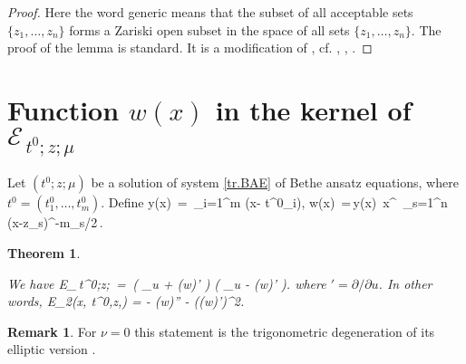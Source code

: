\documentclass[12pt]{amsart}
\newtheorem{thm}{Theorem}[section]
\numberwithin{equation}{section}
\theoremstyle{definition}
\newtheorem*{rem}{Remark}
\let\mc\mathcal
\let\der\partial
\begin{document}
\begin{proof}
Here the word generic means 
that the subset of all acceptable  sets $\{z_1,\dots,z_n\}$ forms a Zariski open subset in the space
of all sets $\{z_1,\dots,z_n\}$. The proof of the lemma is standard. It is a modification of \cite[Theorem 8]{ScV},
cf. \cite[Section 4.4]{MV1}, \cite[Section 5.4]{MV2}, \cite[Section 10.6]{MTV1}.
\end{proof}



\section{Function $w(x)$ in the kernel of  $\mc E_{\,t^0;z;\mu}$}
\label{sec 6}





Let $(t^0;z;\mu)$  be a solution of system \eqref{tr.BAE} of  Bethe ansatz equations, where
$t^0=(t^0_1,\dots,t^0_m)$. Define 
\bean
\label{Y&u}
y(x) \,=\, \prod_{i=1}^m (x- t^0_i), \qquad  
w(x) \,=\,y(x)\, x^{} \,\prod_{s=1}^n (x-z_s)^{-m_s/2}\,.
\eean

\begin{thm}
\label{Dthm}


We have
\bean
\label{Dform}
\mc E_{\,t^0;z;\mu}\, =\, \big( \der_u + (\ln w)' \big) \big( \der_u - (\ln w)' \big).
\eean
where  $' = \der/\der u$. In other words,  
\bean
\label{hatB2form}
E_2(x, t^0\!,z,\mu)  = - (\ln w)'' - ((\ln w)')^2.
\eean
\end{thm}

\begin{rem}
For $\nu=0$ this statement is the trigonometric degeneration of its elliptic version \cite[Theorem 5.3]{ThV}.
\end{rem}
\end{document}
